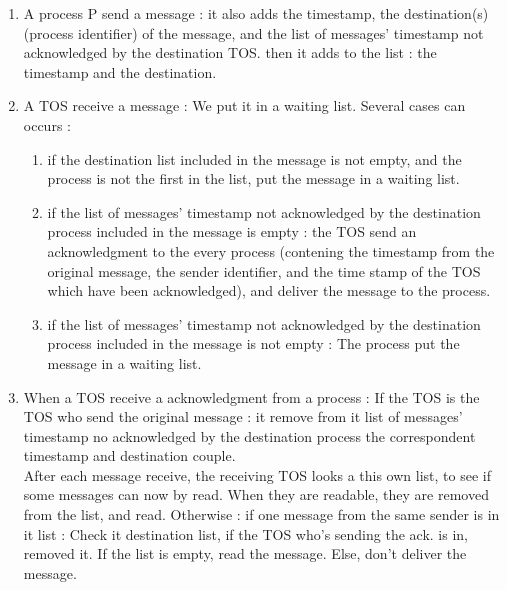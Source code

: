 \documentclass[a4paper,11pt]{article} %
\begin{document}
\begin{enumerate}
\item A process P send a message : it also adds the timestamp,  the destination(s) (process identifier) of the message, and the list of messages' timestamp not acknowledged by the destination TOS. then it adds to the list : the timestamp and the destination.
\item A TOS receive a message : We put it in a waiting list. Several cases can occurs : 
\begin{enumerate}
\item if the destination list included in the message is not empty, and the process is not the first in the list, put the message in a waiting list.
\item if the list of messages' timestamp not acknowledged by the destination process included in the message is empty : the TOS send an acknowledgment to the every process (contening the timestamp from the original message, the sender identifier, and the time stamp of the TOS which have been acknowledged), and deliver the message to the process. 
\item if the list of messages' timestamp not acknowledged by the destination process included in the message is not empty : The process put the message in a waiting list. 
\end{enumerate}
\item When a TOS receive a acknowledgment from a process : 
If the TOS is the TOS who send the original message :  it remove from it list of messages' timestamp no acknowledged by the destination process the correspondent timestamp and destination couple. \\After each message receive, the receiving TOS looks a this own list, to see if some messages can now by read. When they are readable, they are removed from the list, and read. 
Otherwise : if one message from the same sender is in it list : Check it destination list, if the TOS who's sending the ack. is in, removed it. If the list is empty, read the message. Else, don't deliver the message.
\end{enumerate}
\end{document}
